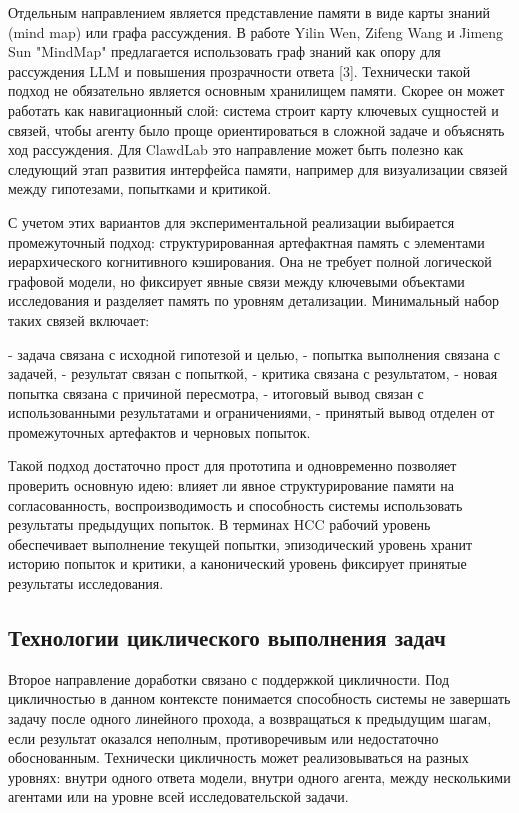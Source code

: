 Отдельным направлением является представление памяти в виде карты знаний (mind map) или графа рассуждения. В работе Yilin Wen, Zifeng Wang и Jimeng Sun "MindMap" предлагается использовать граф знаний как опору для рассуждения LLM и повышения прозрачности ответа [3]. Технически такой подход не обязательно является основным хранилищем памяти. Скорее он может работать как навигационный слой: система строит карту ключевых сущностей и связей, чтобы агенту было проще ориентироваться в сложной задаче и объяснять ход рассуждения. Для ClawdLab это направление может быть полезно как следующий этап развития интерфейса памяти, например для визуализации связей между гипотезами, попытками и критикой.

С учетом этих вариантов для экспериментальной реализации выбирается промежуточный подход: структурированная артефактная память с элементами иерархического когнитивного кэширования. Она не требует полной логической графовой модели, но фиксирует явные связи между ключевыми объектами исследования и разделяет память по уровням детализации. Минимальный набор таких связей включает:

- задача связана с исходной гипотезой и целью,
- попытка выполнения связана с задачей,
- результат связан с попыткой,
- критика связана с результатом,
- новая попытка связана с причиной пересмотра,
- итоговый вывод связан с использованными результатами и ограничениями,
- принятый вывод отделен от промежуточных артефактов и черновых попыток.

Такой подход достаточно прост для прототипа и одновременно позволяет проверить основную идею: влияет ли явное структурирование памяти на согласованность, воспроизводимость и способность системы использовать результаты предыдущих попыток. В терминах HCC рабочий уровень обеспечивает выполнение текущей попытки, эпизодический уровень хранит историю попыток и критики, а канонический уровень фиксирует принятые результаты исследования.

\subsection{Технологии циклического выполнения задач}

Второе направление доработки связано с поддержкой цикличности. Под цикличностью в данном контексте понимается способность системы не завершать задачу после одного линейного прохода, а возвращаться к предыдущим шагам, если результат оказался неполным, противоречивым или недостаточно обоснованным. Технически цикличность может реализовываться на разных уровнях: внутри одного ответа модели, внутри одного агента, между несколькими агентами или на уровне всей исследовательской задачи.

